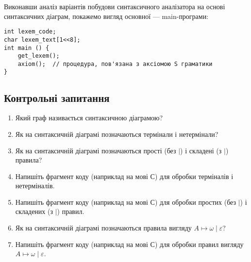 Виконавши аналіз варіантів побудови синтаксичного аналізатора на основі синтаксичних діаграм, покажемо вигляд основної --- main-програми:
\begin{verbatim}
int lexem_code;
char lexem_text[1<<8];
int main () { 
    get_lexem();
    axiom();  // процедура, пов'язана з аксіомою S граматики
}
\end{verbatim}

\subsection{Контрольні запитання}

\begin{enumerate}
	\item Який граф називається синтаксичною діаграмою?
	\item Як на синтаксичній діаграмі позначаються термінали і нетермінали?
	\item Як на синтаксичній діаграмі позначаються прості (без $\vert$) і складені (з $\vert$)  правила?
	\item Напишіть фрагмент коду (наприклад на мові С) для обробки терміналів і нетерміналів.
	\item Напишіть фрагмент коду (наприклад на мові С) для обробки простих (без $\vert$) і складених (з $\vert$) правил.
	\item Як на синтаксичній діаграмі позначаються правила вигляду $A \mapsto \omega \mid \varepsilon$?
	\item Напишіть фрагмент коду (наприклад на мові С) для обробки правил вигляду $A \mapsto \omega \mid \varepsilon$.
\end{enumerate}
